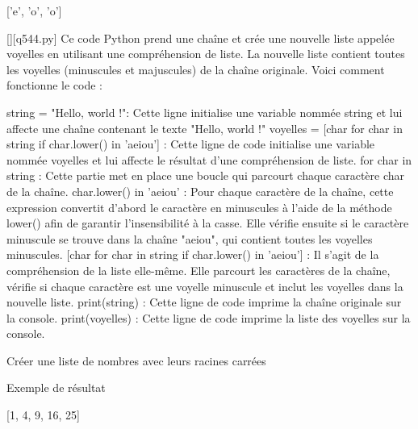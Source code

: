 ['e', 'o', 'o']
        \par
        \begin{solution}
            \renewcommand{\nomfichier}{q544.py}
            \pythonfile{\chemincode \nomfichier}[][\nomfichier]
            Ce code Python prend une chaîne et crée une nouvelle liste appelée voyelles en utilisant une compréhension de liste. La nouvelle liste contient toutes les voyelles (minuscules et majuscules) de la chaîne originale. Voici comment fonctionne le code :

    string = "Hello, world !": Cette ligne initialise une variable nommée string et lui affecte une chaîne contenant le texte "Hello, world !"
    voyelles = [char for char in string if char.lower() in 'aeiou'] : Cette ligne de code initialise une variable nommée voyelles et lui affecte le résultat d'une compréhension de liste.
        for char in string : Cette partie met en place une boucle qui parcourt chaque caractère char de la chaîne.
        char.lower() in 'aeiou' : Pour chaque caractère de la chaîne, cette expression convertit d'abord le caractère en minuscules à l'aide de la méthode lower() afin de garantir l'insensibilité à la casse. Elle vérifie ensuite si le caractère minuscule se trouve dans la chaîne "aeiou", qui contient toutes les voyelles minuscules.
        [char for char in string if char.lower() in 'aeiou'] : Il s'agit de la compréhension de la liste elle-même. Elle parcourt les caractères de la chaîne, vérifie si chaque caractère est une voyelle minuscule et inclut les voyelles dans la nouvelle liste.
    print(string) : Cette ligne de code imprime la chaîne originale sur la console.
    print(voyelles) : Cette ligne de code imprime la liste des voyelles sur la console.
        \end{solution}
        

        \question
        Créer une liste de nombres avec leurs racines carrées

Exemple de résultat

[1, 4, 9, 16, 25]


